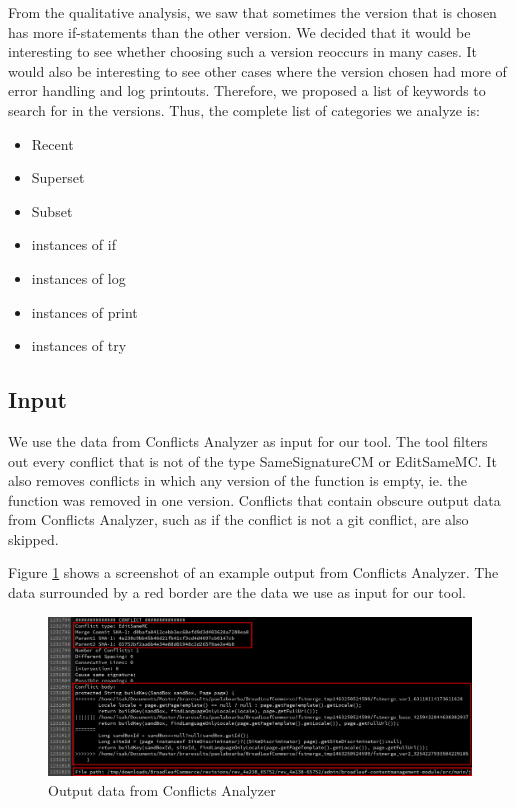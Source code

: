 From the qualitative analysis, we saw that sometimes the version that is chosen has more if-statements than the other version. We decided that it would be interesting to see whether choosing such a version reoccurs in many cases. It would also be interesting to see other cases where the version chosen had more of error handling and log printouts. Therefore, we proposed a list of keywords to search for in the versions. Thus, the complete list of categories we analyze is:
\begin{itemize}
\item Recent
\item Superset
\item Subset
\item instances of if
\item instances of log
\item instances of print
\item instances of try
\end{itemize}

\subsection{Input}
We use the data from Conflicts Analyzer as input for our tool. The tool filters out every conflict that is not of the type SameSignatureCM or EditSameMC. It also removes conflicts in which any version of the function is empty, ie. the function was removed in one version. Conflicts that contain obscure output data from Conflicts Analyzer, such as if the conflict is not a git conflict, are also skipped.

Figure \ref{fig:screenshot} shows a screenshot of an example output from Conflicts Analyzer. The data surrounded by a red border are the data we use as input for our tool.
\begin{figure}[H]
\centering
\includegraphics[width=400pt]{figure/screenshot.png}
\caption{Output data from Conflicts Analyzer}\label{fig:screenshot}
\end{figure}

